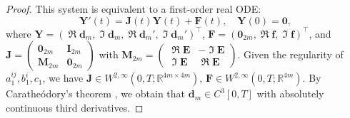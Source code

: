 \documentclass[11pt,reqno,oneside]{amsart}
\numberwithin{equation}{section}
\theoremstyle{definition}
\theoremstyle{remark}
\numberwithin{equation}{section}
\begin{document}
\begin{proof}
		This system is equivalent to a first-order real ODE:
		\begin{equation*}
			\mathbf{Y}'(t) = \mathbf{J}(t)\mathbf{Y}(t) + \mathbf{F}(t),\quad \mathbf{Y}(0)=\mathbf{0},
		\end{equation*}
		where $\mathbf{Y} = \left( \operatorname{\Re}\mathbf{d}_m, \operatorname{\Im}\mathbf{d}_m, \operatorname{\Re}\mathbf{d}_m', \operatorname{\Im}\mathbf{d}_m' \right)^\top$, $\mathbf{F} = \left( \mathbf{0}_{2m}, \operatorname{\Re}\mathbf{f}, \operatorname{\Im}\mathbf{f} \right)^\top$, and
		$
		\mathbf{J} = \begin{pmatrix}
			\mathbf{0}_{2m} & \mathbf{I}_{2m} \\
			\mathbf{M}_{2m} & \mathbf{0}_{2m}
		\end{pmatrix}
		$ with $\mathbf{M}_{2m} = \begin{pmatrix}
			\operatorname{\Re}\mathbf{E} & -\operatorname{\Im}\mathbf{E} \\
			\operatorname{\Im}\mathbf{E} & \operatorname{\Re}\mathbf{E}
		\end{pmatrix}$. Given the regularity of $a^{ij}_1, b^i_1, c_1$, we have  
		$\mathbf{J} \in W^{2,\infty}(0,T; \mathbb{R}^{4m \times 4m})$,  
		$\mathbf{F} \in W^{2,\infty}(0,T; \mathbb{R}^{4m})$.  
		By Carathe\'odory's theorem \cite[Theorem 1.45]{Roubicek},  
		we obtain that  $\mathbf{d}_m \in C^3[0,T]$ with absolutely continuous third derivatives.  
		

\end{proof}
\end{document}
